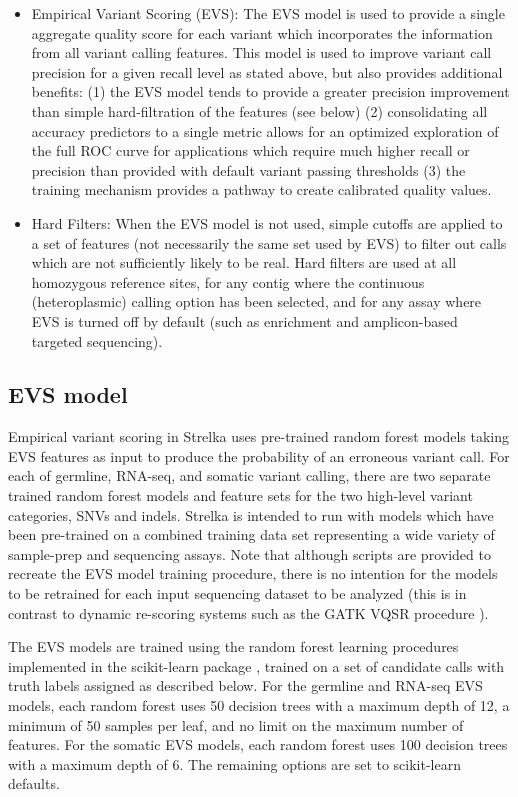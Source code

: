 \documentclass{article}
\begin{document}
\begin{itemize}
    \item Empirical Variant Scoring (EVS):
    The EVS model is used to provide a single aggregate quality score for each variant which incorporates the information from all variant calling features. This model is used to improve variant call precision for a given recall level as stated above, but also provides additional benefits: (1) the EVS model tends to provide a greater precision improvement than simple hard-filtration of the features (see below) (2) consolidating all accuracy predictors to a single metric allows for an optimized exploration of the full ROC curve for applications which require much higher recall or precision than provided with default variant passing thresholds (3) the training mechanism provides a pathway to create calibrated quality values.
    \item Hard Filters:
    When the EVS model is not used, simple cutoffs are applied to a set of features (not necessarily the same set used by EVS) to filter out calls which are not sufficiently likely to be real. Hard filters are used at all homozygous reference sites, for any contig where the continuous (heteroplasmic) calling option has been selected, and for any assay where EVS is turned off by default (such as enrichment and amplicon-based targeted sequencing).
\end{itemize}


\subsection{EVS model}
\label{sec:EVSModel}

Empirical variant scoring in Strelka uses pre-trained random forest models taking EVS features as input to produce the probability of an erroneous variant call. For each of germline, RNA-seq, and somatic variant calling, there are two separate trained random forest models and feature sets for the two high-level variant categories, SNVs and indels. Strelka is intended to run with models which have been pre-trained on a combined training data set representing a wide variety of sample-prep and sequencing assays. Note that although scripts are provided to recreate the EVS model training procedure, there is no intention for the models to be retrained for each input sequencing dataset to be analyzed (this is in contrast to dynamic re-scoring systems such as the GATK VQSR procedure \cite{depristo2011}).

The EVS models are trained using the random forest learning procedures implemented in the scikit-learn package \cite{scikit-learn}, trained on a set of candidate calls with truth labels assigned as described below. For the germline and RNA-seq EVS models, each random forest uses 50 decision trees with a maximum depth of 12, a minimum of 50 samples per leaf, and no limit on the maximum number of features. For the somatic EVS models, each random forest uses 100 decision trees with a maximum depth of 6. The remaining options are set to scikit-learn defaults.
\end{document}
